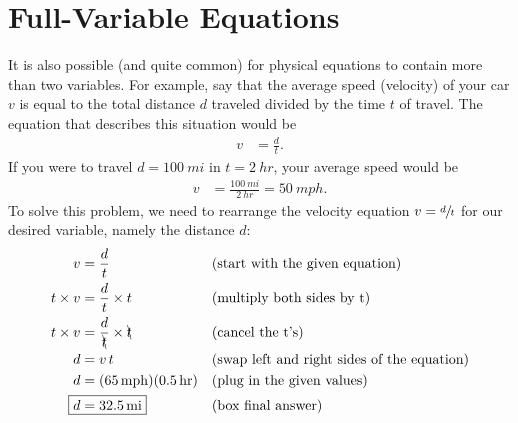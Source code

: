 \section{Full-Variable Equations}
It is also possible (and quite common) for physical equations to contain more than two variables. For example, say that the average speed (velocity) of your car $v$ is equal to the total distance $d$ traveled divided by the time $t$ of travel. The equation that describes this situation would be 
\begin{align*}
v &= \frac{d}{t}.
\end{align*}
If you were to travel $d=\SI{100}{mi}$ in $t=\SI{2}{hr}$, your average speed would be 
\begin{align*}
v &= \frac{\SI{100}{mi}}{\SI{2}{hr}} = \SI{50}{mph}.
\end{align*}
{
To solve this problem, we need to rearrange the velocity equation $v = \sfrac{d}{t}$ for our desired variable, namely the distance $d$:
\begin{align*}
v &= \frac{d}{t} & & \text{(start with the given equation)} \\
t \times v &= \frac{d}{t} \times t & & \text{(multiply both sides by t)} \\
t \times v &= \frac{d}{\bcancel{t}} \times \bcancel{t} & & \text{(cancel the t's)} \\
d &= v\,t & & \text{(swap left and right sides of the equation)} \\
d &= (\SI{65}{mph})(\SI{0.5}{hr}) & & \text{(plug in the given values)} \\
\Aboxed{d &= \SI{32.5}{mi} }& & \text{(box final answer)}
\end{align*}
}
